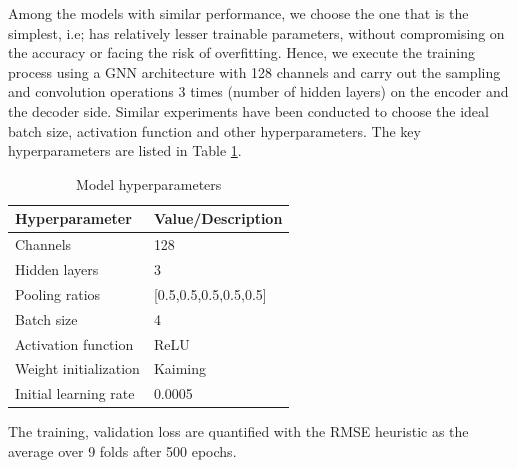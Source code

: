 Among the models with similar performance, we choose the one that is the simplest, i.e; has relatively lesser trainable parameters, without compromising on the accuracy or facing the risk of overfitting. Hence, we execute the training process using a GNN architecture with 128 channels and carry out the sampling and convolution operations 3 times (number of hidden layers) on the encoder and the decoder side. Similar experiments have been conducted to choose the ideal batch size, activation function and other hyperparameters. The key hyperparameters are listed in Table \ref{table:hp}. 
\begin{table}[ht]
    \centering
    \caption{Model hyperparameters}
    \label{table:hp}
    \begin{tabular}{|l|l|}
    \hline
    \textbf{Hyperparameter}    & \textbf{Value/Description} \\
    \hline
    Channels    & 128                           \\
    \hline
    Hidden layers    & 3                          \\
    \hline
    Pooling ratios             & [0.5,0.5,0.5,0.5,0.5]                       \\
    \hline
    Batch size                 & 4                         \\
    \hline
    Activation function        & ReLU                       \\
    \hline
    Weight initialization    &  Kaiming                        \\
    \hline
    Initial learning rate       & 0.0005                       \\
    \hline
    \end{tabular}
    \end{table}
The training, validation loss are quantified with the \gls{RMSE} heuristic as the average over 9 folds after 500 epochs. 

